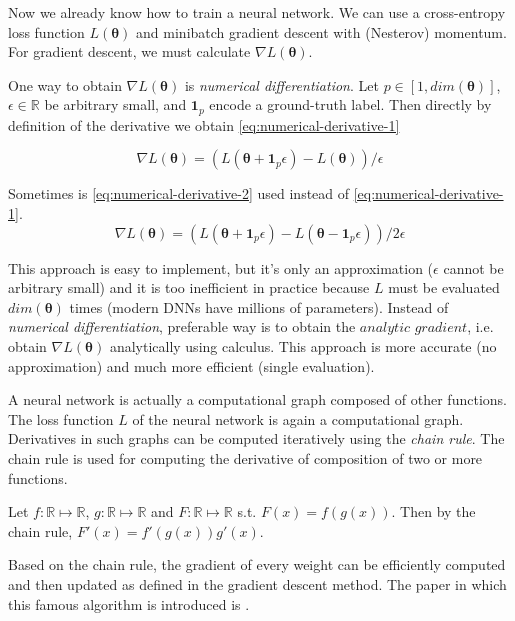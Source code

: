 Now we already know how to train a neural network. We can use a cross-entropy loss function $L (\pmb \theta)$ and minibatch gradient descent with (Nesterov) momentum. For gradient descent, we must calculate $\nabla L (\pmb \theta)$.

One way to obtain $\nabla L (\pmb \theta)$ is \textit{numerical differentiation}. 
Let $p \in [1, dim(\pmb \theta)]$, $\epsilon \in \mathbb{R}$ be arbitrary small, and $\pmb 1_p$ encode a ground-truth label. Then directly by definition of the derivative we obtain \ref{eq:numerical-derivative-1}

\begin{equation}\label{eq:numerical-derivative-1}
\nabla L (\pmb \theta) = (L(\pmb \theta + \pmb 1_p \epsilon) - L (\pmb \theta)) / \epsilon
\end{equation}

Sometimes is \ref{eq:numerical-derivative-2} used instead of \ref{eq:numerical-derivative-1}.
\begin{equation}\label{eq:numerical-derivative-2}
\nabla L (\pmb \theta) = (L(\pmb \theta + \pmb 1_p \epsilon) - L (\pmb \theta - \pmb 1_p \epsilon)) / 2 \epsilon
\end{equation}

This approach is easy to implement, but it's only an approximation ($\epsilon$ cannot be arbitrary small) and it is too inefficient in practice because $L$ must be evaluated $dim(\pmb\theta)$ times (modern DNNs have millions of parameters). Instead of \textit{numerical differentiation}, preferable way is to obtain the $\textit{analytic gradient}$, i.e. obtain $\nabla L (\pmb \theta)$ analytically using calculus. This approach is more accurate (no approximation) and much more efficient (single evaluation).


A neural network is actually a computational graph composed of other functions. The loss function $L$ of the neural network is again a computational graph. Derivatives in such graphs can be computed iteratively using the \textit{chain rule}. The chain rule is used for computing the derivative of composition of two or more functions. 

Let $f: \mathbb{R} \mapsto \mathbb{R}$, $g: \mathbb{R} \mapsto \mathbb{R}$ and $F: \mathbb{R} \mapsto \mathbb{R}$ s.t. $F(x) = f(g(x))$. Then by the chain rule, $F'(x) = f'(g(x))g'(x)$.

Based on the chain rule, the gradient of every weight can be efficiently computed and then updated as defined in the gradient descent method. The paper in which this famous algorithm is introduced is \cite{Rumelhart:1986:LIR:104279.104293}.